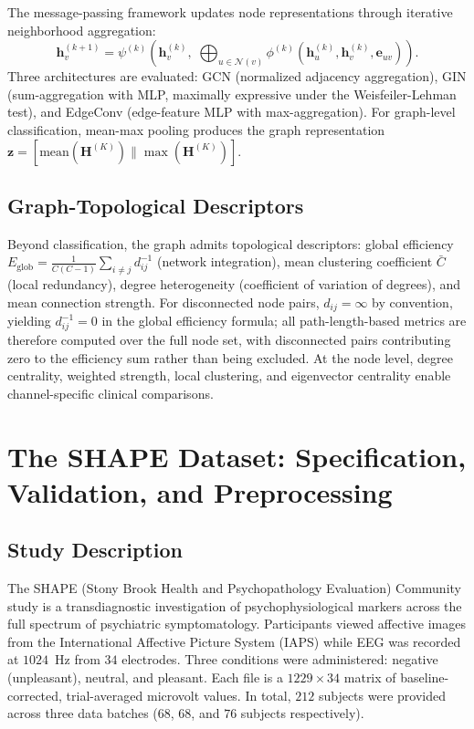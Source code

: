 The message-passing framework \cite{Gilmer2017} updates node representations through iterative neighborhood aggregation:
\begin{equation}
    \mathbf{h}_v^{(k+1)} = \psi^{(k)}\!\left(\mathbf{h}_v^{(k)},\; \bigoplus_{u \in \mathcal{N}(v)} \phi^{(k)}\!\left(\mathbf{h}_u^{(k)}, \mathbf{h}_v^{(k)}, \mathbf{e}_{uv}\right)\right).
\end{equation}
Three architectures are evaluated: GCN \cite{Kipf2017} (normalized adjacency aggregation), GIN \cite{Xu2019} (sum-aggregation with MLP, maximally expressive under the Weisfeiler-Lehman test), and EdgeConv \cite{Wang2019HeterogeneousGNN} (edge-feature MLP with max-aggregation). For graph-level classification, mean-max pooling produces the graph representation $\mathbf{z} = [\text{mean}(\mathbf{H}^{(K)}) \| \max(\mathbf{H}^{(K)})]$.

\subsection{Graph-Topological Descriptors}

Beyond classification, the graph admits topological descriptors: global efficiency $E_{\text{glob}} = \frac{1}{C(C-1)} \sum_{i \neq j} d_{ij}^{-1}$ (network integration), mean clustering coefficient $\bar{C}$ (local redundancy), degree heterogeneity (coefficient of variation of degrees), and mean connection strength. For disconnected node pairs, $d_{ij} = \infty$ by convention, yielding $d_{ij}^{-1} = 0$ in the global efficiency formula; all path-length-based metrics are therefore computed over the full node set, with disconnected pairs contributing zero to the efficiency sum rather than being excluded. At the node level, degree centrality, weighted strength, local clustering, and eigenvector centrality enable channel-specific clinical comparisons.


\section{The SHAPE Dataset: Specification, Validation, and Preprocessing}
\label{sec:ch5_dataset}

\subsection{Study Description}

The SHAPE (Stony Brook Health and Psychopathology Evaluation) Community study is a transdiagnostic investigation of psychophysiological markers across the full spectrum of psychiatric symptomatology. Participants viewed affective images from the International Affective Picture System (IAPS) \cite{lang_iaps_2008} while EEG was recorded at $1024$~Hz from $34$ electrodes. Three conditions were administered: negative (unpleasant), neutral, and pleasant. Each file is a $1229 \times 34$ matrix of baseline-corrected, trial-averaged microvolt values. In total, $212$ subjects were provided across three data batches ($68$, $68$, and $76$ subjects respectively).

